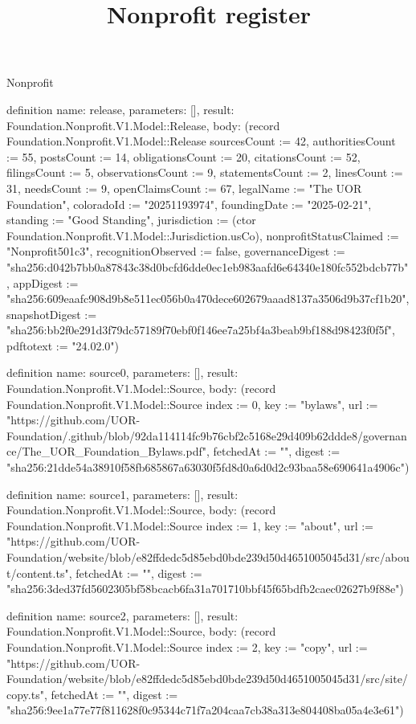 \begin{lexlean}{Nonprofit}
\title{Nonprofit register}
\begin{semanticmodule}
definition{
  name: release,
  parameters: [],
  result: Foundation.Nonprofit.V1.Model::Release,
  body: (record Foundation.Nonprofit.V1.Model::Release {sourcesCount := 42, authoritiesCount := 55, postsCount := 14, obligationsCount := 20, citationsCount := 52, filingsCount := 5, observationsCount := 9, statementsCount := 2, linesCount := 31, needsCount := 9, openClaimsCount := 67, legalName := "The UOR Foundation", coloradoId := "20251193974", foundingDate := "2025-02-21", standing := "Good Standing", jurisdiction := (ctor Foundation.Nonprofit.V1.Model::Jurisdiction.usCo), nonprofitStatusClaimed := "Nonprofit501c3", recognitionObserved := false, governanceDigest := "sha256:d042b7bb0a87843c38d0bcfd6dde0ec1eb983aafd6e64340e180fc552bdcb77b", appDigest := "sha256:609eaafc908d9b8e511ec056b0a470dece602679aaad8137a3506d9b37cf1b20", snapshotDigest := "sha256:bb2f0e291d3f79dc57189f70ebf0f146ee7a25bf4a3beab9bf188d98423f0f5f", pdftotext := "24.02.0"})
}

definition{
  name: source0,
  parameters: [],
  result: Foundation.Nonprofit.V1.Model::Source,
  body: (record Foundation.Nonprofit.V1.Model::Source {index := 0, key := "bylaws", url := "https://github.com/UOR-Foundation/.github/blob/92da114114fc9b76cbf2c5168e29d409b62ddde8/governance/The_UOR_Foundation_Bylaws.pdf", fetchedAt := "", digest := "sha256:21dde54a38910f58fb685867a63030f5fd8d0a6d0d2c93baa58e690641a4906c"})
}

definition{
  name: source1,
  parameters: [],
  result: Foundation.Nonprofit.V1.Model::Source,
  body: (record Foundation.Nonprofit.V1.Model::Source {index := 1, key := "about", url := "https://github.com/UOR-Foundation/website/blob/e82ffdedc5d85ebd0bde239d50d4651005045d31/src/about/content.ts", fetchedAt := "", digest := "sha256:3ded37fd5602305bf58bcacb6fa31a701710bbf45f65bdfb2caec02627b9f88e"})
}

definition{
  name: source2,
  parameters: [],
  result: Foundation.Nonprofit.V1.Model::Source,
  body: (record Foundation.Nonprofit.V1.Model::Source {index := 2, key := "copy", url := "https://github.com/UOR-Foundation/website/blob/e82ffdedc5d85ebd0bde239d50d4651005045d31/src/site/copy.ts", fetchedAt := "", digest := "sha256:9ee1a77e77f811628f0c95344c71f7a204caa7cb38a313e804408ba05a4e3e61"})
}


\end{semanticmodule}
\end{lexlean}
